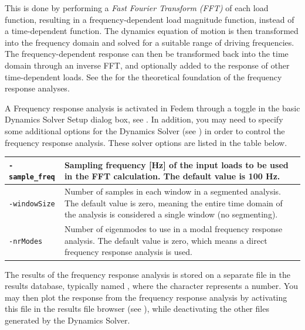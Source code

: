 {This is done by performing a {\sl Fast Fourier Transform (FFT)} of each load
function, resulting in a frequency-dependent load magnitude function, instead of
a time-dependent function. The dynamics equation of motion is then transformed
into the frequency domain and solved for a suitable range of driving
frequencies. The frequency-dependent response can then be transformed back into
the time domain through an inverse FFT, and optionally added to the response of
other time-dependent loads.
See the 
for the theoretical foundation of the frequency response analyses.

A Frequency response analysis is activated in Fedem through a toggle in
the basic Dynamics Solver Setup dialog box, see
.
In addition, you may need to specify some additional options for the Dynamics
Solver (see )
in order to control the frequency response analysis.
These solver options are listed in the table below.

\noindent
\begin{tabular}{ | m{22mm} | m{9cm}| }
  \hline{\tt-sample\_freq} &
  Sampling frequency [Hz] of the input loads to be used in the FFT calculation.
  The default value is 100 Hz. \\

  \hline{\tt-windowSize} &
  Number of samples in each window in a segmented analysis.
  The default value is zero, meaning the entire time domain of the analysis
  is considered a single window (no segmenting). \\

  \hline{\tt-nrModes} &
  Number of eigenmodes to use in a modal frequency response analysis.
  The default value is zero, which means a direct frequency response analysis
  is used. \\
  \hline
\end{tabular}

The results of the frequency response analysis is stored on a separate
 file in the results database, typically named ,
where the \File{\#} character represents a number.
You may then plot the response from the frequency response analysis by
activating this file in the results file browser (see
),
while deactivating the other  files generated by the Dynamics Solver.


}
